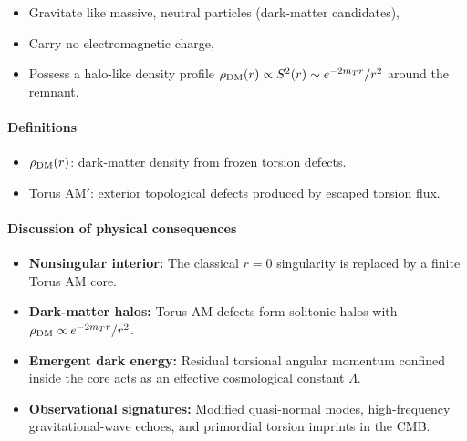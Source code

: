 \documentclass{article}
\newcommand{\TorsionProfile}{S^2(r)}
\begin{document}
\begin{itemize}
  \item Gravitate like massive, neutral particles (dark-matter candidates),
  \item Carry no electromagnetic charge,
  \item Possess a halo-like density profile
    \(\rho_{\rm DM}(r)\propto \TorsionProfile\sim e^{-2m_T r}/r^2\)
    around the remnant.
\end{itemize}

\paragraph{Definitions}
\begin{itemize}
  \item \(\rho_{\rm DM}(r)\): dark-matter density from frozen torsion defects.
  \item Torus AM\('\): exterior topological defects produced by escaped torsion flux.
\end{itemize}

\paragraph{Discussion of physical consequences}
\begin{itemize}
  \item \textbf{Nonsingular interior:} The classical \(r=0\) singularity is replaced by a finite Torus AM core.
  \item \textbf{Dark-matter halos:} Torus AM defects form solitonic halos with
    \(\rho_{\rm DM}\propto e^{-2m_T r}/r^2\).
  \item \textbf{Emergent dark energy:} Residual torsional angular momentum confined inside the core
    acts as an effective cosmological constant \(\Lambda\).
  \item \textbf{Observational signatures:} Modified quasi-normal modes, high-frequency gravitational-wave
    echoes, and primordial torsion imprints in the CMB.
\end{itemize}

\medskip
\begin{center}
\end{center}
\medskip
\end{document}
